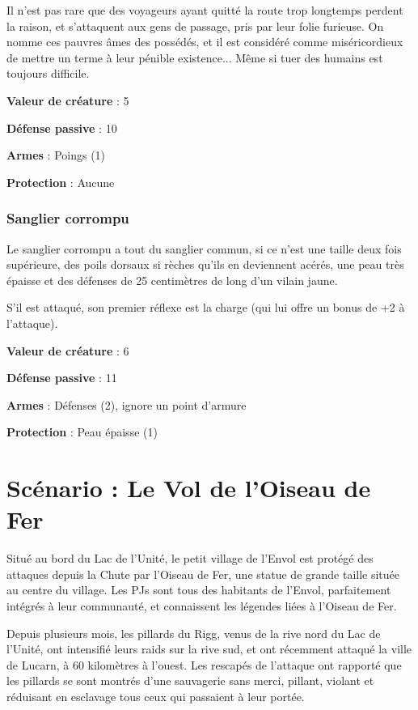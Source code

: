 \documentclass[10pt,twoside,twocolumn,openany,bg=print,justified]{dndbook}
\begin{document}
Il n'est pas rare que des voyageurs ayant quitté la route trop longtemps perdent la raison, et s'attaquent aux gens de passage, pris par leur folie furieuse. On nomme ces pauvres âmes des possédés, et il est considéré comme miséricordieux de mettre un terme à leur pénible existence... Même si tuer des humains est toujours difficile.

\textbf{Valeur de créature} : 5

\textbf{Défense passive} : 10

\textbf{Armes} : Poings (1)

\textbf{Protection} : Aucune

\subsection*{Sanglier corrompu}

Le sanglier corrompu a tout du sanglier commun, si ce n'est une taille deux fois supérieure, des poils dorsaux si rèches qu'ils en deviennent acérés, une peau très épaisse et des défenses de 25 centimètres de long d'un vilain jaune. 

S'il est attaqué, son premier réflexe est la charge (qui lui offre un bonus de +2 à l'attaque).

\textbf{Valeur de créature} : 6

\textbf{Défense passive} : 11

\textbf{Armes} : Défenses (2), ignore un point d'armure

\textbf{Protection} : Peau épaisse (1)

\chapter{Scénario : Le Vol de l'Oiseau de Fer}

Situé au bord du Lac de l'Unité, le petit village de l'Envol est protégé des attaques depuis la Chute par l'Oiseau de Fer, une statue de grande taille située au centre du village. Les PJs sont tous des habitants de l'Envol, parfaitement intégrés à leur communauté, et connaissent les légendes liées à l'Oiseau de Fer.

Depuis plusieurs mois, les pillards du Rigg, venus de la rive nord du Lac de l'Unité, ont intensifié leurs raids sur la rive sud, et ont récemment attaqué la ville de Lucarn, à 60 kilomètres à l'ouest. Les rescapés de l'attaque ont rapporté que les pillards se sont montrés d'une sauvagerie sans merci, pillant, violant et réduisant en esclavage tous ceux qui passaient à leur portée.
\end{document}
